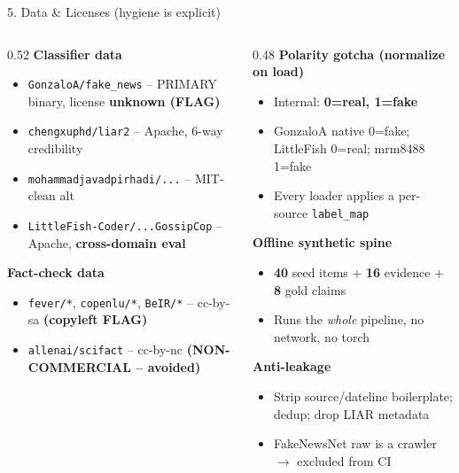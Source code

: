 \documentclass[10pt,aspectratio=169]{beamer}
\begin{document}
\begin{frame}{5. Data \& Licenses (hygiene is explicit)}
\begin{columns}[T]
\begin{column}{0.52\textwidth}
\textbf{Classifier data}
\begin{itemize}\scriptsize
  \item \texttt{GonzaloA/fake\_news} -- PRIMARY binary, license \textbf{unknown (FLAG)}
  \item \texttt{chengxuphd/liar2} -- Apache, 6-way credibility
  \item \texttt{mohammadjavadpirhadi/...} -- MIT-clean alt
  \item \texttt{LittleFish-Coder/...GossipCop} -- Apache, \textbf{cross-domain eval}
\end{itemize}
\textbf{Fact-check data}
\begin{itemize}\scriptsize
  \item \texttt{fever/*}, \texttt{copenlu/*}, \texttt{BeIR/*} -- cc-by-sa \textbf{(copyleft FLAG)}
  \item \texttt{allenai/scifact} -- cc-by-nc \textbf{(NON-COMMERCIAL -- avoided)}
\end{itemize}
\end{column}
\begin{column}{0.48\textwidth}
\textbf{Polarity gotcha (normalize on load)}
\begin{itemize}\scriptsize
  \item Internal: \textbf{0=real, 1=fake}
  \item GonzaloA native 0=fake; LittleFish 0=real; mrm8488 1=fake
  \item Every loader applies a per-source \texttt{label\_map}
\end{itemize}
\textbf{Offline synthetic spine}
\begin{itemize}\scriptsize
  \item \textbf{40} seed items + \textbf{16} evidence + \textbf{8} gold claims
  \item Runs the \emph{whole} pipeline, no network, no torch
\end{itemize}
\textbf{Anti-leakage}
\begin{itemize}\scriptsize
  \item Strip source/dateline boilerplate; dedup; drop LIAR metadata
  \item FakeNewsNet raw is a crawler $\rightarrow$ excluded from CI
\end{itemize}
\end{column}
\end{columns}
\end{frame}
\end{document}
